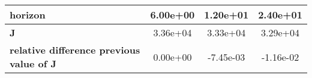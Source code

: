 \begin{tiny}\begin{tabular}{|l|c|c|c|}
\hline
\textbf{horizon}&6.00e+00&1.20e+01&2.40e+01\\\hline
\textbf{J}&3.36e+04&3.33e+04&3.29e+04\\\hline
\textbf{relative difference previous value of J}&0.00e+00&-7.45e-03&-1.16e-02\\\hline
\end{tabular}
\end{tiny}